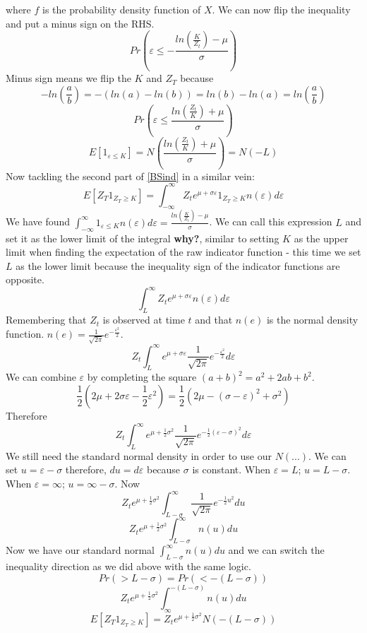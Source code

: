 \documentclass[12pt]{article}
\begin{document}
where $f$ is the probability density function of $X$.
We can now flip the inequality and put a minus sign on the RHS.
$$Pr\left( \varepsilon\leq -\frac{ln\left(\frac{K}{Z_t}\right)
-\mu}{\sigma}\right) $$
Minus sign means we flip the $K$ and $Z_T$ because
$$-ln\left(\frac{a}{b}\right) =-(ln(a)-ln(b))=ln(b)-ln(a)=
ln\left(\frac{a}{b}\right)$$
$$Pr\left( \varepsilon\leq\frac{ln\left(\frac{Z_t}{K}\right)
+\mu}{\sigma}\right) $$
$$E\left[ 1_{\varepsilon\leq K} \right] =
N\left( \frac{ln\left(\frac{Z_t}{K}\right)
+\mu}{\sigma}\right) =N(-L)$$
Now tackling the second part of \ref{BSind} in a similar vein:
$$E\left[ Z_T1_{Z_T\geq K} \right] =
\int_{-\infty}^{\infty}Z_te^{\mu+\sigma\varepsilon}1_{Z_T\geq
K}n(\varepsilon)
d\varepsilon$$
We have found
$\int_{-\infty}^{\infty} 1_{\varepsilon\leq K}
n(\varepsilon)d\varepsilon=
\frac{ln\left(\frac{K}{Z_t}\right)-\mu}{\sigma}$. We can call this expression
$L$ and set it as the lower limit of the integral \textbf{why?}, similar to
setting $K$ as the upper limit when finding the expectation of the raw
indicator function - this time we set $L$ as the lower limit because the
inequality sign of the indicator functions are opposite.
$$\int_{L}^{\infty}Z_te^{\mu+\sigma\varepsilon}n(\varepsilon)d\varepsilon$$
Remembering that $Z_t$ is observed at time $t$ and that $n(e)$ is the normal
density function.
$n(e)=\frac{1}{\sqrt{2\pi}}e^{-\frac{\varepsilon^2}{2}}$.
$$Z_t\int_{L}^{\infty}e^{\mu+\sigma\varepsilon}
\frac{1}{\sqrt{2\pi}}e^{-\frac{\varepsilon^2}{2}}d\varepsilon$$
We can combine $\varepsilon$ by completing the square
$(a+b)^2=a^2+2ab+b^2$.
$$\frac{1}{2}(2\mu+2\sigma\varepsilon-\frac{1}{2}\varepsilon^2)=
\frac{1}{2}(2\mu-(\sigma-\varepsilon)^2+\sigma^2)$$
Therefore
$$Z_t\int_{L}^{\infty}e^{\mu+\frac{1}{2}\sigma^2}
\frac{1}{\sqrt{2\pi}}e^{-\frac{1}{2}(\varepsilon-\sigma)^2}d\varepsilon$$
We still need the standard normal density in order to use our $N(...)$. We can
set $u=\varepsilon-\sigma$ therefore, $du=d\varepsilon$ because $\sigma$ is
constant.
When $\varepsilon=L$; $u=L-\sigma$.
When $\varepsilon=\infty$; $u=\infty-\sigma$. Now
$$Z_te^{\mu+\frac{1}{2}\sigma^2}
\int_{L-\sigma}^{\infty}\frac{1}{\sqrt{2\pi}}e^{-\frac{1}{2}u^2}du$$
$$Z_te^{\mu+\frac{1}{2}\sigma^2}
\int_{L-\sigma}^{\infty}n(u)du$$
Now we have our standard normal $\int_{L-\sigma}^{\infty}n(u)du$ and we can
switch the inequality direction as we did above with the same logic.
$$Pr(>L-\sigma)=Pr(<-(L-\sigma))$$
$$Z_te^{\mu+\frac{1}{2}\sigma^2}
\int_{\infty}^{-(L-\sigma)}n(u)du$$
$$E\left[ Z_T1_{Z_T\geq K} \right] =
Z_te^{\mu+\frac{1}{2}\sigma^2}N(-(L-\sigma))$$
\end{document}
